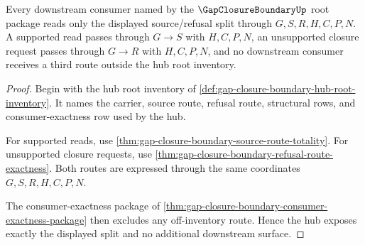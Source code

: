 \begin{theorem}
\label{thm:gap-closure-boundary-hub-unblock-surface}
Every downstream consumer named by the $\GapClosureBoundaryUp$ root package reads only the displayed source/refusal split through $G,S,R,H,C,P,N$. A supported read passes through $G \longrightarrow S$ with $H,C,P,N$, an unsupported closure request passes through $G \longrightarrow R$ with $H,C,P,N$, and no downstream consumer receives a third route outside the hub root inventory.
\end{theorem}
\begin{proof}
Begin with the hub root inventory of \autoref{def:gap-closure-boundary-hub-root-inventory}. It names the carrier, source route, refusal route, structural rows, and consumer-exactness row used by the hub.

For supported reads, use \autoref{thm:gap-closure-boundary-source-route-totality}. For unsupported closure requests, use \autoref{thm:gap-closure-boundary-refusal-route-exactness}. Both routes are expressed through the same coordinates $G,S,R,H,C,P,N$.

The consumer-exactness package of \autoref{thm:gap-closure-boundary-consumer-exactness-package} then excludes any off-inventory route. Hence the hub exposes exactly the displayed split and no additional downstream surface.
\end{proof}
